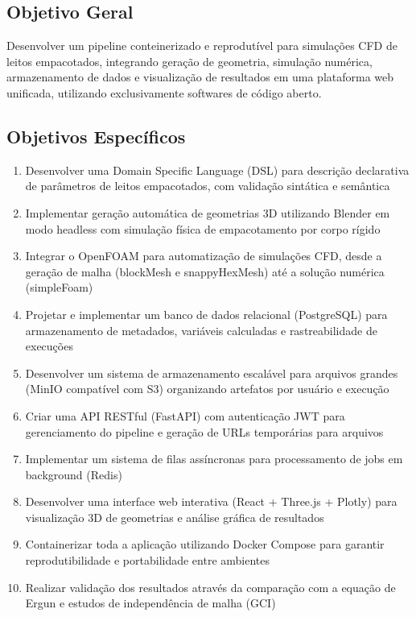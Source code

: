 \subsection{Objetivo Geral}

Desenvolver um pipeline conteinerizado e reprodutível para simulações CFD de leitos empacotados, integrando geração de geometria, simulação numérica, armazenamento de dados e visualização de resultados em uma plataforma web unificada, utilizando exclusivamente softwares de código aberto.

\subsection{Objetivos Específicos}

\begin{enumerate}
    \item Desenvolver uma Domain Specific Language (DSL) para descrição declarativa de parâmetros de leitos empacotados, com validação sintática e semântica
    
    \item Implementar geração automática de geometrias 3D utilizando Blender em modo headless com simulação física de empacotamento por corpo rígido
    
    \item Integrar o OpenFOAM para automatização de simulações CFD, desde a geração de malha (blockMesh e snappyHexMesh) até a solução numérica (simpleFoam)
    
    \item Projetar e implementar um banco de dados relacional (PostgreSQL) para armazenamento de metadados, variáveis calculadas e rastreabilidade de execuções
    
    \item Desenvolver um sistema de armazenamento escalável para arquivos grandes (MinIO compatível com S3) organizando artefatos por usuário e execução
    
    \item Criar uma API RESTful (FastAPI) com autenticação JWT para gerenciamento do pipeline e geração de URLs temporárias para arquivos
    
    \item Implementar um sistema de filas assíncronas para processamento de jobs em background (Redis)
    
    \item Desenvolver uma interface web interativa (React + Three.js + Plotly) para visualização 3D de geometrias e análise gráfica de resultados
    
    \item Containerizar toda a aplicação utilizando Docker Compose para garantir reprodutibilidade e portabilidade entre ambientes
    
    \item Realizar validação dos resultados através da comparação com a equação de Ergun e estudos de independência de malha (GCI)
\end{enumerate}

